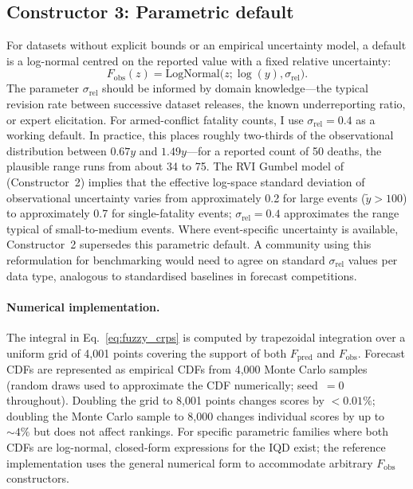 \subsection*{Constructor 3: Parametric default}
For datasets without explicit bounds or an empirical uncertainty model, a default is a log-normal centred on the reported value with a fixed relative uncertainty:
%
\begin{equation}
    F_\text{obs}(z) = \text{LogNormal}\bigl(z; \log(y), \sigma_\text{rel}\bigr).
\end{equation}
%
The parameter $\sigma_\text{rel}$ should be informed by domain knowledge---the typical revision rate between successive dataset releases, the known underreporting ratio, or expert elicitation. For armed-conflict fatality counts, I use $\sigma_\text{rel} = 0.4$ as a working default. In practice, this places roughly two-thirds of the observational distribution between $0.67y$ and $1.49y$---for a reported count of 50 deaths, the plausible range runs from about 34 to 75. The RVI Gumbel model of \citet{vesco2026uncertainty} (Constructor~2) implies that the effective log-space standard deviation of observational uncertainty varies from approximately 0.2 for large events ($\tilde{y} > 100$) to approximately 0.7 for single-fatality events; $\sigma_\text{rel} = 0.4$ approximates the range typical of small-to-medium events. Where event-specific uncertainty is available, Constructor~2 supersedes this parametric default. A community using this reformulation for benchmarking would need to agree on standard $\sigma_\text{rel}$ values per data type, analogous to standardised baselines in forecast competitions.

\paragraph{Numerical implementation.}
The integral in Eq.~\ref{eq:fuzzy_crps} is computed by trapezoidal integration over a uniform grid of 4{,}001 points covering the support of both $F_\text{pred}$ and $F_\text{obs}$. Forecast CDFs are represented as empirical CDFs from 4{,}000 Monte Carlo samples (random draws used to approximate the CDF numerically; seed~$= 0$ throughout). Doubling the grid to 8{,}001 points changes scores by $< 0.01\%$; doubling the Monte Carlo sample to 8{,}000 changes individual scores by up to ${\sim}4\%$ but does not affect rankings. For specific parametric families where both CDFs are log-normal, closed-form expressions for the IQD exist; the reference implementation uses the general numerical form to accommodate arbitrary $F_\text{obs}$ constructors.
